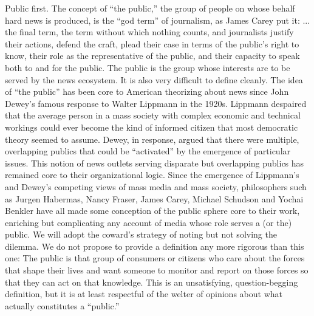 Public first. The concept of ``the public,'' the group of people on whose behalf
hard news is produced, is the ``god term'' of journalism, as James Carey put it:
... the final term, the term without which nothing counts, and journalists
justify their actions, defend the craft, plead their case in terms of the
public’s right to know, their role as the representative of the public, and
their capacity to speak both to and for the public.
The public is the group whose interests are to be served by the news ecosystem.
It is also very difficult to define cleanly.
The idea of ``the public'' has been core to American theorizing about news since
John Dewey’s famous response to Walter Lippmann in the 1920s. Lippmann
despaired that the average person in a mass society with complex economic
and technical workings could ever become the kind of informed citizen that
most democratic theory seemed to assume. Dewey, in response, argued that there
were multiple, overlapping publics that could be ``activated'' by the emergence
of particular issues. This notion of news outlets serving disparate but overlapping
publics has remained core to their organizational logic.
Since the emergence of Lippmann’s and Dewey’s competing views of mass media
and mass society, philosophers such as Jurgen Habermas, Nancy Fraser, James
Carey, Michael Schudson and Yochai Benkler have all made some conception of
the public sphere core to their work, enriching but complicating any account of
media whose role serves a (or the) public.
We will adopt the coward’s strategy of noting but not solving the dilemma.
We do not propose to provide a definition any more rigorous than this one:
The public is that group of consumers or citizens who care about the
forces that shape their lives and want someone to monitor and report
on those forces so that they can act on that knowledge.
This is an unsatisfying, question-begging definition, but it is at least respectful of
the welter of opinions about what actually constitutes a ``public.''

